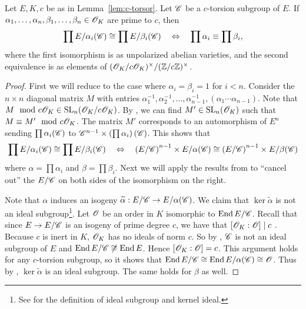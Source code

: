 \documentclass{amsart}
\begin{document}
\begin{lemma}\label{lem:prod-equiv-torsor}
  Let $E,K,c$ be as in Lemma~\ref{lem:c-torsor}. Let $\mathscr{C}$ be a $c$-torsion subgroup of $E$. If $\alpha_1,\dots,\alpha_n,\beta_1,\dots,\beta_n \in \mathscr{O}_K$ are prime to $c$, then
  \[
    \prod E/\alpha_i(\mathscr{C}) \cong \prod E/\beta_i(\mathscr{C})
    \quad\Leftrightarrow\quad
    \prod \alpha_i \equiv \prod \beta_i,
  \]
  where the first isomorphism is as unpolarized abelian varieties, and the second equivalence is as elements of $(\mathscr{O}_K/c\mathscr{O}_K)^\times/(\mathbb{Z}/c\mathbb{Z})^\times$.
\end{lemma}
\begin{proof}
  First we will reduce to the case where $\alpha_i = \beta_i = 1$ for $i < n$. Consider the $n \times n$ diagonal matrix $M$ with entries $\alpha_1^{-1},\alpha_2^{-1},\dots,\alpha_{n-1}^{-1}, (\alpha_1 \cdots \alpha_{n-1})$. Note that $M\mod{c\mathscr{O}_K} \in \operatorname{SL}_n(\mathscr{O}_K/c\mathscr{O}_K)$. By \cite[Cor.~5.2, Pg.~18]{ktheory1964bass}, we can find $M' \in \operatorname{SL}_n(\mathscr{O}_K)$ such that $M \equiv M' \mod{c\mathscr{O}_K}$. The matrix $M'$ corresponds to an automorphism of $E^n$ sending $\prod \alpha_i(\mathscr{C})$ to $\mathscr{C}^{n-1} \times \left(\prod \alpha_i\right)(\mathscr{C})$. This shows that
  \[
    \prod E/\alpha_i(\mathscr{C}) \cong \prod E/\beta_i(\mathscr{C})
    \quad\Leftrightarrow\quad
    \left(E/\mathscr{C}\right)^{n-1} \times E/\alpha(\mathscr{C}) \cong \left(E/\mathscr{C}\right)^{n-1} \times E/\beta(\mathscr{C})
  \]
  where $\alpha = \prod\alpha_i$ and $\beta = \prod \beta_i$. Next we will apply the results from \cite{kani2011products} to ``cancel out'' the $E/\mathscr{C}$ on both sides of the isomorphism on the right.

  Note that $\alpha$ induces an isogeny $\widetilde{\alpha}: E/\mathscr{C} \to E/\alpha(\mathscr{C})$. We claim that $\ker\tilde{\alpha}$ is not an ideal subgroup\footnote{See \cite[Sec.~2, Pg.~302]{kani2011products} for the definition of ideal subgroup and kernel ideal.}. Let $\mathscr{O}$ be an order in $K$ isomorphic to $\operatorname{End} E/\mathscr{C}$. Recall that since $E \to E/\mathscr{C}$ is an isogeny of prime degree $c$, we have that $[\mathscr{O}_K : \mathscr{O}] \mid c$ \cite[Prop.~5]{kohel1996endomorphism}. Because $c$ is inert in $K$, $\mathscr{O}_K$ has no ideals of norm $c$. So by \cite[Thm.~20b]{kani2011products}, $\mathscr{C}$ is not an ideal subgroup of $E$ and $\operatorname{End} E/\mathscr{C} \not\cong \operatorname{End} E$. Hence $[\mathscr{O}_K : \mathscr{O}] = c$. This argument holds for any $c$-torsion subgroup, so it shows that $\operatorname{End} E/\mathscr{C} \cong \operatorname{End} E/\alpha(\mathscr{C}) \cong \mathscr{O}$. Thus by \cite[Thm.~20b]{kani2011products}, $\ker\tilde{\alpha}$ is an ideal subgroup. The same holds for $\beta$ as well.


\end{proof}
\end{document}
